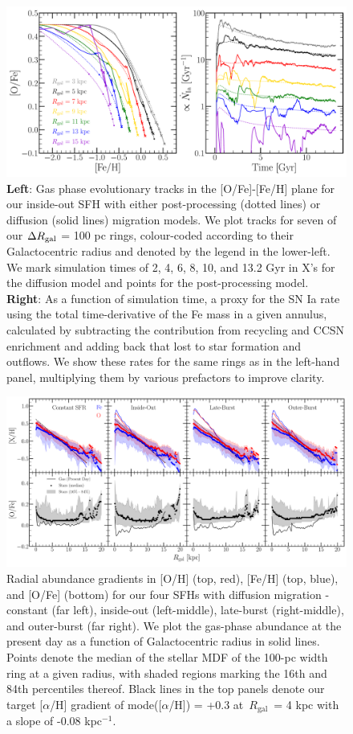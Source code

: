 \documentclass[draft2.tex]{subfiles}
\begin{document}
\begin{figure} 
\centering 
\includegraphics[scale = 0.42]{tracks.pdf} 
\caption{\textbf{Left}: Gas phase evolutionary tracks in the [O/Fe]-[Fe/H] 
plane for our inside-out SFH with either post-processing (dotted lines) or 
diffusion (solid lines) migration models. We plot tracks for seven of our 
$\Delta R_\text{gal}$ = 100 pc rings, 
colour-coded according to their Galactocentric radius and denoted by the 
legend in the lower-left. We mark simulation times of 2, 4, 6, 8, 10, and 13.2 
Gyr in X's for the diffusion model and points for the post-processing model. 
\textbf{Right}: As a function of simulation time, a proxy for the SN Ia rate 
using the total time-derivative of the Fe mass in a given annulus, calculated 
by subtracting the contribution from recycling and CCSN enrichment and adding 
back that lost to star formation and outflows. We show these rates for the 
same rings as in the left-hand panel, multiplying them by various prefactors 
to improve clarity. } 
\label{fig:tracks} 
\end{figure} 

\begin{figure} 
\centering 
\includegraphics[scale = 0.32]{metallicity_gradient.pdf} 
\caption{Radial abundance gradients in [O/H] (top, red), [Fe/H] (top, blue), 
and [O/Fe] (bottom) for our four SFHs with diffusion migration - constant (far 
left), inside-out (left-middle), late-burst (right-middle), and outer-burst 
(far right). We plot the gas-phase abundance at the present day as a function 
of Galactocentric radius in solid lines. Points denote the median of the stellar 
MDF of the 100-pc width ring at a given radius, with shaded regions marking 
the 16th and 84th percentiles thereof. Black lines in the top panels denote our 
target [$\alpha$/H] gradient of mode([$\alpha$/H]) = +0.3 at~$R_\text{gal}$~= 
4 kpc with a slope of -0.08 kpc$^{-1}$. } 
\label{fig:metallicity_gradient} 
\end{figure} 
\end{document}
